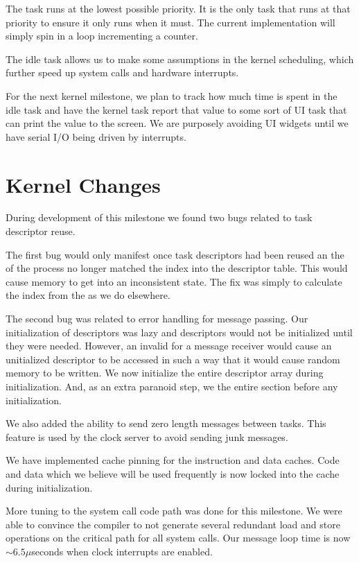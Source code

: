 \documentclass[pdftex,10pt,a4paper]{article}
\begin{document}
The  task runs at the lowest possible priority. It is the
only task that runs at that priority to ensure it only runs when it
must. The current implementation will simply spin in a 
loop incrementing a counter.

The idle task allows us to make some assumptions in the kernel
scheduling, which further speed up system calls and hardware
interrupts.

For the next kernel milestone, we plan to track how much time is spent
in the idle task and have the kernel task report that value to some
sort of UI task that can print the value to the screen. We are
purposely avoiding UI widgets until we have serial I/O being driven by
interrupts.

\section*{Kernel Changes}

During development of this milestone we found two bugs related to task
descriptor reuse.

The first bug would only manifest once task descriptors had been
reused an the  of the process no longer matched the index
into the descriptor table. This would cause memory to get into an
inconsistent state. The fix was simply to calculate the index from the
 as we do elsewhere.

The second bug was related to error handling for message passing. Our
initialization of descriptors was lazy and descriptors would not be
initialized until they were needed. However, an invalid  for
a message receiver would cause an unitialized descriptor to be
accessed in such a way that it would cause random memory to be
written. We now initialize the entire descriptor array during
initialization. And, as an extra paranoid step, we  the
entire  section before any initialization.

We also added the ability to send zero length messages between
tasks. This feature is used by the clock server to avoid sending junk
messages.

We have implemented cache pinning for the instruction and data
caches. Code and data which we believe will be used frequently is now
locked into the cache during initialization.

More tuning to the system call code path was done for this
milestone. We were able to convince the compiler to not generate
several redundant load and store operations on the critical path for
all system calls. Our message loop time is now $\sim6.5\mu$seconds
when clock interrupts are enabled.
\end{document}
